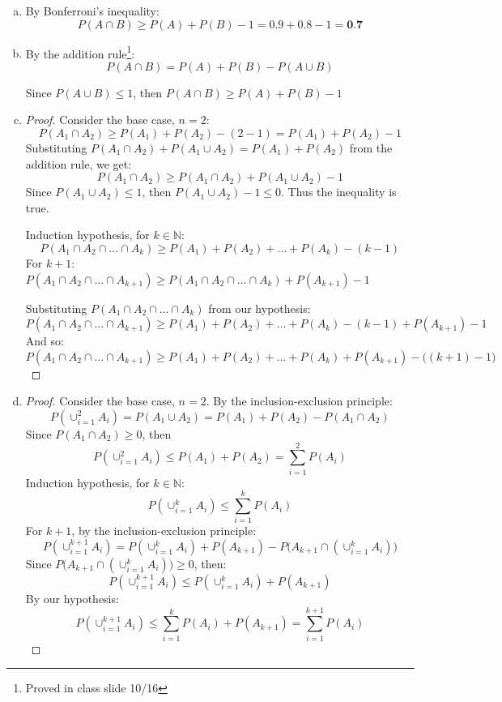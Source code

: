 \documentclass[11pt]{extarticle}
\begin{document}
\begin{enumerate}[(a)]
\item By Bonferroni's inequality: $$ P(A \cap B) \geq P(A) + P(B) - 1 =  0.9 + 0.8 - 1 = \textbf{0.7} $$
\item By the addition rule\footnote{Proved in class slide 10/16}: $$P(A \cap B) = P(A) + P(B) - P(A \cup B)$$

Since $P(A \cup B) \leq 1$, then $P(A \cap B) \geq P(A) + P(B) - 1 $

\item \begin{proof}[Proof] Consider the base case, $n=2$:
$$P(A_1 \cap A_2) \geq P(A_1) + P(A_2) - (2-1) = P(A_1) + P(A_2) - 1$$
Substituting $ P(A_1 \cap A_2) + P(A_1 \cup A_2) = P(A_1) + P(A_2) $ from the addition rule, we get:
$$P(A_1 \cap A_2) \geq P(A_1 \cap A_2) + P(A_1 \cup A_2) - 1$$
Since $P(A_1 \cup A_2) \leq 1$, then $P(A_1 \cup A_2) - 1 \leq 0$. Thus the inequality is true.

Induction hypothesis, for $k \in \mathbb{N}$: $$P(A_1 \cap A_2 \cap \dots \cap A_k) \geq P(A_1) + P(A_2) + \dots + P(A_k) - (k-1)$$
For $k+1$: $P(A_1 \cap A_2 \cap \dots \cap A_{k+1}) \geq P(A_1 \cap A_2 \cap \dots \cap A_{k}) + P(A_{k+1}) - 1 $
 
Substituting $P(A_1 \cap A_2 \cap \dots \cap A_{k})$ from our hypothesis: $$P(A_1 \cap A_2 \cap \dots \cap A_{k+1})  \geq P(A_1) + P(A_2) + \dots + P(A_k) - (k-1) + P(A_{k+1}) - 1 $$
And so:
$$P(A_1 \cap A_2 \cap \dots \cap A_{k+1})  \geq P(A_1) + P(A_2) + \dots + P(A_k) +  P(A_{k+1}) - \big( (k+1) - 1 \big) $$


\end{proof}

\item \begin{proof}[Proof]

Consider the base case, $n=2$. By the inclusion-exclusion principle:
$$P(\cup_{i=1}^2 A_i) = P(A_1 \cup A_2) = P(A_1) + P(A_2) - P(A_1 \cap A_2)$$
Since $P(A_1 \cap A_2) \geq 0$, then  $$P(\cup_{i=1}^2 A_i) \leq P(A_1) + P(A_2) 
 = \sum_{i=1}^{2} P(A_i)$$
Induction hypothesis, for $k \in \mathbb{N}$: $$P(\cup_{i=1}^k A_i) \leq \sum_{i=1}^{k} P(A_i)$$
For $k+1$, by the inclusion-exclusion principle:
$$P ( \cup_{i=1}^{k+1} A_i ) = P ( \cup_{i=1}^{k} A_i) + P(A_{k+1}) - P \big( A_{k+1} \cap  (\cup_{i=1}^{k} A_i) \big)$$
Since $P \big( A_{k+1} \cap  (\cup_{i=1}^{k} A_i) \big) \geq 0$, then:
$$P ( \cup_{i=1}^{k+1} A_i ) \leq P ( \cup_{i=1}^{k} A_i) + P(A_{k+1})$$
By our hypothesis:
$$P ( \cup_{i=1}^{k+1} A_i ) \leq \sum_{i=1}^{k} P(A_i) + P(A_{k+1}) = \sum_{i=1}^{k+1} P(A_i)$$
\end{proof}
\end{enumerate}
\end{document}
